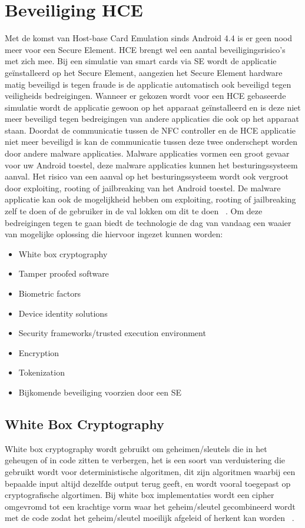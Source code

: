 \section{Beveiliging HCE}
\label{sec:Beveiliging}
Met de komst van Host-base Card Emulation sinds Android 4.4 is er geen nood meer voor een Secure Element. HCE brengt wel een aantal beveiligingsrisico's met zich mee. Bij een simulatie van smart cards via SE wordt de applicatie geïnstalleerd op het Secure Element, aangezien het Secure Element hardware matig beveiligd is tegen fraude is de applicatie automatisch ook beveiligd tegen veiligheids bedreigingen. Wanneer er gekozen wordt voor een HCE gebaseerde simulatie wordt de applicatie gewoon op het apparaat geïnstalleerd en is deze niet meer beveiligd tegen bedreigingen van andere applicaties die ook op het apparaat staan.
Doordat de communicatie tussen de NFC controller en de HCE applicatie niet meer beveiligd is kan de communicatie tussen deze twee onderschept worden door andere malware applicaties. Malware applicaties vormen een groot gevaar voor uw Android toestel, deze malware applicaties kunnen het besturingssysteem aanval. Het risico van een aanval op het besturingssysteem wordt ook vergroot door exploiting, rooting of jailbreaking van het Android toestel. De malware applicatie kan ook de mogelijkheid hebben om exploiting, rooting of jailbreaking zelf te doen of de gebruiker in de val lokken om dit te doen ~\autocite{SCA2014}. 
Om deze bedreigingen tegen te gaan biedt de technologie de dag van vandaag een waaier van mogelijke oplossing die hiervoor ingezet kunnen worden:

\begin{itemize}
	\item White box cryptography
	\item Tamper proofed software
	\item Biometric factors
	\item Device identity solutions
	\item Security frameworks/trusted execution environment
	\item Encryption
	\item Tokenization
	\item Bijkomende beveiliging voorzien door een SE
\end{itemize}

\subsection{White Box Cryptography}
White box cryptography wordt gebruikt om geheimen/sleutels die in het geheugen of in code zitten te verbergen, het is een soort van verduistering die gebruikt wordt voor deterministische algoritmen, dit zijn algoritmen waarbij een bepaalde input altijd dezelfde output terug geeft, en wordt vooral toegepast op cryptografische algortimen. Bij white box implementaties wordt een cipher omgevromd tot een krachtige vorm waar het geheim/sleutel gecombineerd wordt met de code zodat het geheim/sleutel moeilijk afgeleid of herkent kan worden ~\autocite{SCA2014}.

